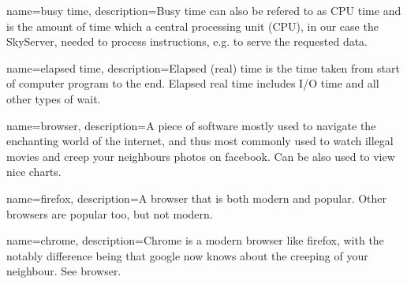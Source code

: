 {
  name=busy time,
  description={Busy time can also be refered to as CPU time and is the amount of time which a 
  central processing unit (CPU), in our case the \gls{SkyServer}, needed to process instructions,
   e.g. to serve the requested data. %
   }
}


{
  name=elapsed time,
  description={Elapsed (real) time is the time taken from start of computer program to the end. 
  Elapsed real time includes I/O time and all other types of wait. 
  }
}


{
  name=browser,
  description={A piece of software mostly used to navigate the enchanting world of the internet, and thus most commonly
used to watch illegal movies and creep your neighbours photos on facebook. Can be also used to view nice charts.}
}


{
  name=firefox,
  description={A browser that is both modern and popular. Other browsers are popular too, but not modern. }
}


{
  name=chrome,
  description={Chrome is a modern browser like firefox, with the notably difference being that google now knows about the
creeping of your neighbour. See browser.}
}

